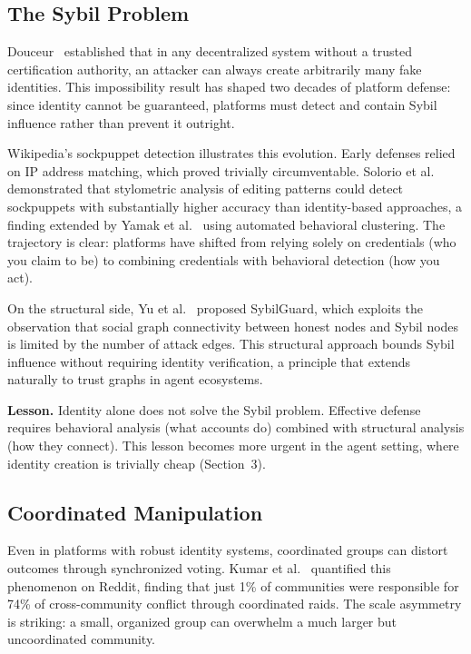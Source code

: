 \documentclass[11pt]{article}
\begin{document}
\subsection{The Sybil Problem}

Douceur~\cite{douceur2002} established that in any decentralized system without a trusted certification authority, an attacker can always create arbitrarily many fake identities. This impossibility result has shaped two decades of platform defense: since identity cannot be guaranteed, platforms must detect and contain Sybil influence rather than prevent it outright.

Wikipedia's sockpuppet detection illustrates this evolution. Early defenses relied on IP address matching, which proved trivially circumventable. Solorio et al.~\cite{solorio2013} demonstrated that stylometric analysis of editing patterns could detect sockpuppets with substantially higher accuracy than identity-based approaches, a finding extended by Yamak et al.~\cite{yamak2018} using automated behavioral clustering. The trajectory is clear: platforms have shifted from relying solely on credentials (who you claim to be) to combining credentials with behavioral detection (how you act).

On the structural side, Yu et al.~\cite{yu2006} proposed SybilGuard, which exploits the observation that social graph connectivity between honest nodes and Sybil nodes is limited by the number of attack edges. This structural approach bounds Sybil influence without requiring identity verification, a principle that extends naturally to trust graphs in agent ecosystems.

\textbf{Lesson.} Identity alone does not solve the Sybil problem. Effective defense requires behavioral analysis (what accounts do) combined with structural analysis (how they connect). This lesson becomes more urgent in the agent setting, where identity creation is trivially cheap (Section~3).

\subsection{Coordinated Manipulation}

Even in platforms with robust identity systems, coordinated groups can distort outcomes through synchronized voting. Kumar et al.~\cite{kumar2018} quantified this phenomenon on Reddit, finding that just 1\% of communities were responsible for 74\% of cross-community conflict through coordinated raids. The scale asymmetry is striking: a small, organized group can overwhelm a much larger but uncoordinated community.
\end{document}
